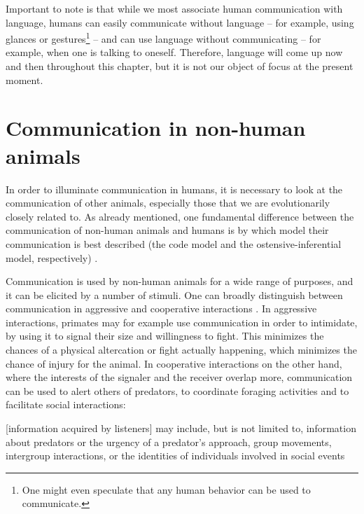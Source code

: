 Important to note is that while we most associate human communication with language, humans can easily communicate without language -- for example, using glances or gestures\footnote{One might even speculate that any human behavior can be used to communicate.} -- and can use language without communicating -- for example, when one is talking to oneself. Therefore, language will come up now and then throughout this chapter, but it is not our object of focus at the present moment.

\section{Communication in non-human animals}
\label{sec:comm:phylogeny}

In order to illuminate communication in humans, it is necessary to look at the communication of other animals, especially those that we are evolutionarily closely related to.
As already mentioned, one fundamental difference between the communication of non-human animals and humans is by which model their communication is best described (the code model and the ostensive-inferential model, respectively) \citep{Scott-Phillips15-primate, Scott-Phillips18-communication}.

Communication is used by non-human animals for a wide range of purposes, and it can be elicited by a number of stimuli.
One can broadly distinguish between communication in aggressive and cooperative interactions \citep{SeyfarthCheney03}. In aggressive interactions, primates may for example use communication in order to intimidate, by using it to signal their size and willingness to fight. This minimizes the chances of a physical altercation or fight actually happening, which minimizes the chance of injury for the animal.
In cooperative interactions on the other hand, where the interests of the signaler and the receiver overlap more, communication can be used to alert others of predators, to coordinate foraging activities and to facilitate social interactions:
\begin{quoting}
    {[information acquired by listeners]} may include, but is not limited to, information about predators or the urgency of a predator’s approach, group movements, intergroup interactions, or the identities of individuals involved in social events
    \hfill \citep[p.~168]{SeyfarthCheney03}
\end{quoting}

